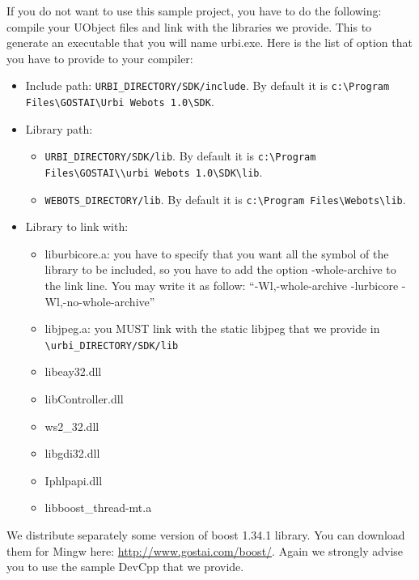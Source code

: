 If you do not want to use this sample project, you have to do the
following: compile your UObject files and link with the libraries we
provide. This to generate an executable that you will name urbi.exe.
Here is the list of option that you have to provide to your compiler:
\begin{itemize}

\item Include path: \nolinkurl{URBI_DIRECTORY/SDK/include}. By default it is
 \verb+c:\Program Files\GOSTAI\Urbi Webots 1.0\SDK+.


\item Library path:
 \begin{itemize}

 \item \nolinkurl{URBI_DIRECTORY/SDK/lib}. By default it is
   \verb+c:\Program Files\GOSTAI\\urbi Webots 1.0\SDK\lib+.



 \item{}  \nolinkurl{WEBOTS_DIRECTORY/lib}. By default it is
   \verb+c:\Program Files\Webots\lib+.


 \end{itemize}



\item{}         Library to link with:
  \begin{itemize}

  \item{} liburbicore.a: you have to specify that you want all the
    symbol of the library to be included, so you have to add the option
    -{}whole-{}archive to the link line. You may write it as follow:
    ``-{}Wl,-{}whole-{}archive -{}lurbicore
    -{}Wl,-{}no-{}whole-{}archive''

  \item{} libjpeg.a: you MUST link with the static libjpeg that we
    provide in \nolinkurl{\urbi_DIRECTORY/SDK/lib}
  \item{} libeay32.dll
  \item{} libController.dll
  \item{} ws2\_32.dll
  \item{} libgdi32.dll
  \item{} Iphlpapi.dll
  \item{} libboost\_thread-{}mt.a
  \end{itemize}


\end{itemize}
We distribute separately some version of boost 1.34.1 library. You can
download them for Mingw here: \url{http://www.gostai.com/boost/}.
Again we strongly advise you to use the sample DevCpp that we provide.


